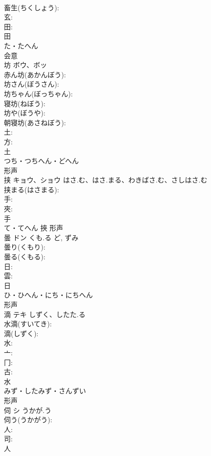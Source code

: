 \documentclass[8pt]{extreport}
\begin{document}
\begin{CJK}{UTF8}{min}
\\	畜生(ちくしょう): 
\\	玄: 
\\	田: 
\\	田	
\\	た・たへん	
\\	会意 
\\	坊	ボウ、ボッ			
\\	赤ん坊(あかんぼう): 
\\	坊さん(ぼうさん): 
\\	坊ちゃん(ぼっちゃん): 
\\	寝坊(ねぼう): 
\\	坊や(ぼうや): 
\\	朝寝坊(あさねぼう): 
\\	土: 
\\	方: 
\\	土	
\\	つち・つちへん・どへん	
\\	形声 
\\	挟	キョウ、ショウ	はさ.む、はさ.まる、わきばさ.む、さしはさ.む		
\\	挟まる(はさまる): 
\\	手: 
\\	夾: 
\\	手	
\\	て・てへん	挾	形声 
\\	曇	ドン	くも.る	ど, ずみ	
\\	曇り(くもり): 
\\	曇る(くもる): 
\\	日: 
\\	雲: 
\\	日	
\\	ひ・ひへん・にち・にちへん	
\\	形声 
\\	滴	テキ	しずく、したた.る		
\\	水滴(すいてき): 
\\	滴(しずく): 
\\	水: 
\\	亠: 
\\	冂: 
\\	古: 
\\	水	
\\	みず・したみず・さんずい	
\\	形声 
\\	伺	シ	うかが.う		
\\	伺う(うかがう): 
\\	人: 
\\	司: 
\\	人	

\end{CJK}
\end{document}
